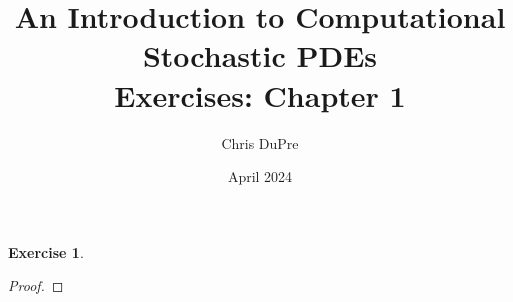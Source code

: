 \documentclass{amsart}
\title{An Introduction to Computational Stochastic PDEs\\ Exercises: Chapter 1}
\author{Chris DuPre }
\date{April 2024}
\theoremstyle{plain}
\theoremstyle{definition}
\newtheorem{exer}{Exercise}[section]
\begin{document}
\maketitle
\setcounter{section}{4}

\begin{exer}
    
\end{exer}
\begin{proof}
    
\end{proof}

\printbibliography
\end{document}
